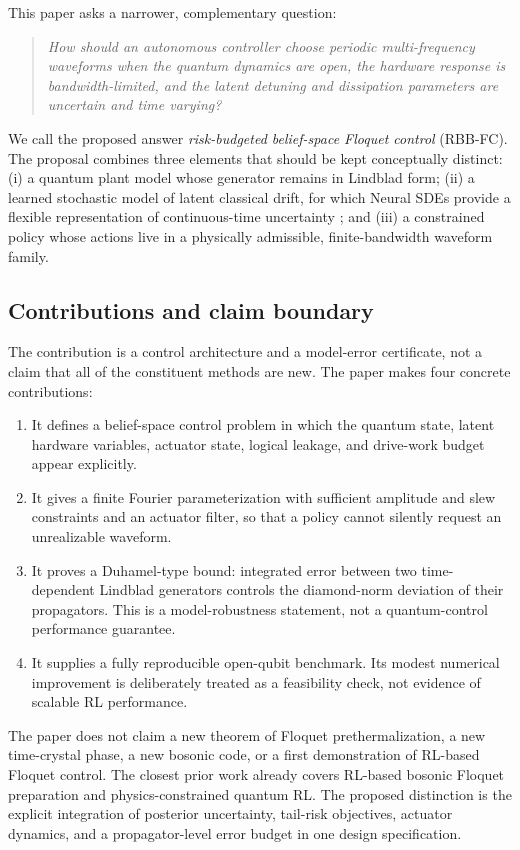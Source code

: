 \documentclass[10pt,twoside]{article}
\begin{document}
This paper asks a narrower, complementary question:
\begin{quote}
\emph{How should an autonomous controller choose periodic multi-frequency waveforms when the quantum dynamics are open, the hardware response is bandwidth-limited, and the latent detuning and dissipation parameters are uncertain and time varying?}
\end{quote}
We call the proposed answer \emph{risk-budgeted belief-space Floquet control} (RBB-FC). The proposal combines three elements that should be kept conceptually distinct: (i) a quantum plant model whose generator remains in Lindblad form; (ii) a learned stochastic model of latent classical drift, for which Neural SDEs provide a flexible representation of continuous-time uncertainty \citep{kidger2021neuralsde}; and (iii) a constrained policy whose actions live in a physically admissible, finite-bandwidth waveform family.

\subsection{Contributions and claim boundary}

The contribution is a control architecture and a model-error certificate, not a claim that all of the constituent methods are new. The paper makes four concrete contributions:
\begin{enumerate}
\item It defines a belief-space control problem in which the quantum state, latent hardware variables, actuator state, logical leakage, and drive-work budget appear explicitly.
\item It gives a finite Fourier parameterization with sufficient amplitude and slew constraints and an actuator filter, so that a policy cannot silently request an unrealizable waveform.
\item It proves a Duhamel-type bound: integrated error between two time-dependent Lindblad generators controls the diamond-norm deviation of their propagators. This is a model-robustness statement, not a quantum-control performance guarantee.
\item It supplies a fully reproducible open-qubit benchmark. Its modest numerical improvement is deliberately treated as a feasibility check, not evidence of scalable RL performance.
\end{enumerate}

The paper does not claim a new theorem of Floquet prethermalization, a new time-crystal phase, a new bosonic code, or a first demonstration of RL-based Floquet control. The closest prior work already covers RL-based bosonic Floquet preparation and physics-constrained quantum RL. The proposed distinction is the explicit integration of posterior uncertainty, tail-risk objectives, actuator dynamics, and a propagator-level error budget in one design specification.
\end{document}
